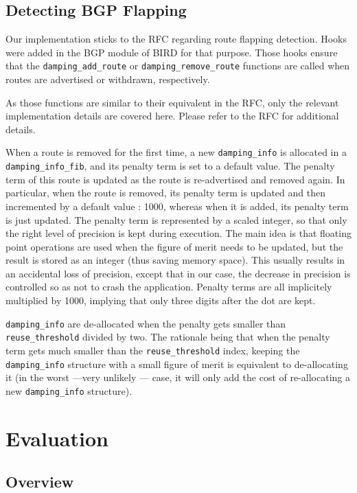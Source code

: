 \documentclass[a4paper,english]{IEEEtran}
\begin{document}
\subsection{Detecting BGP Flapping}

Our implementation sticks to the RFC regarding route flapping detection.
Hooks were added in the BGP module of BIRD for that purpose.
Those hooks ensure that the {\tt\small damping\_add\_route} or {\tt\small damping\_remove\_route} functions are 
called when routes are advertised or withdrawn, respectively.

As those functions are similar to their equivalent in the RFC, only the relevant implementation details are covered here.
Please refer to the RFC for additional details.

When a route is removed for the first time, a new {\tt\small damping\_info} is allocated in a {\tt\small damping\_info\_fib}, and its penalty term is set to a default value.
The penalty term of this route is updated as the route is re-advertised and removed again.
In particular, when the route is removed, its penalty term is updated and then incremented by a default value : 1000, whereas when it is added, its penalty term is just updated.
The penalty term is represented by a scaled integer, so that only the right level of precision is kept during execution.
The main idea is that floating point operations are used when the figure of merit needs to be updated, but the result is stored as an integer (thus saving memory space).
This usually results in an accidental loss of precision, except that in our case, the decrease in precision is controlled so as not to crash the application.
Penalty terms are all implicitely multiplied by 1000, implying that only three digits after the dot are kept.

{\tt\small damping\_info} are de-allocated when the penalty gets smaller than {\tt\small reuse\_threshold} divided by two.
The rationale being that when the penalty term gets much smaller than the {\tt\small reuse\_threshold} index, keeping the {\tt\small damping\_info} structure with a small figure of merit is equivalent to de-allocating it (in the worst ---very unlikely --- case, it will only add the cost of re-allocating a new {\tt\small damping\_info} structure).

\section{Evaluation}

\subsection{Overview}
\end{document}

